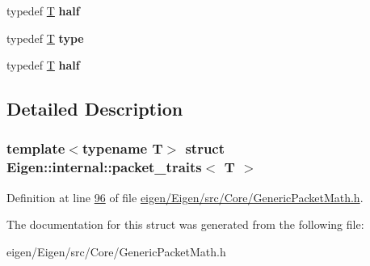 \begin{DoxyCompactItemize}
\item 
\mbox{\label{struct_eigen_1_1internal_1_1packet__traits_ac40b1e8f231d7441d59389e5d10af31b}} 
typedef \hyperlink{group___sparse_core___module}{T} {\bfseries half}
\item 
\mbox{\label{struct_eigen_1_1internal_1_1packet__traits_a811c5bde6641fd0f7a8f88be5e11ce27}} 
typedef \hyperlink{group___sparse_core___module}{T} {\bfseries type}
\item 
\mbox{\label{struct_eigen_1_1internal_1_1packet__traits_ac40b1e8f231d7441d59389e5d10af31b}} 
typedef \hyperlink{group___sparse_core___module}{T} {\bfseries half}
\end{DoxyCompactItemize}


\subsection{Detailed Description}
\subsubsection*{template$<$typename T$>$\newline
struct Eigen\+::internal\+::packet\+\_\+traits$<$ T $>$}



Definition at line \hyperlink{eigen_2_eigen_2src_2_core_2_generic_packet_math_8h_source_l00096}{96} of file \hyperlink{eigen_2_eigen_2src_2_core_2_generic_packet_math_8h_source}{eigen/\+Eigen/src/\+Core/\+Generic\+Packet\+Math.\+h}.



The documentation for this struct was generated from the following file\+:\begin{DoxyCompactItemize}
\item 
eigen/\+Eigen/src/\+Core/\+Generic\+Packet\+Math.\+h\end{DoxyCompactItemize}
